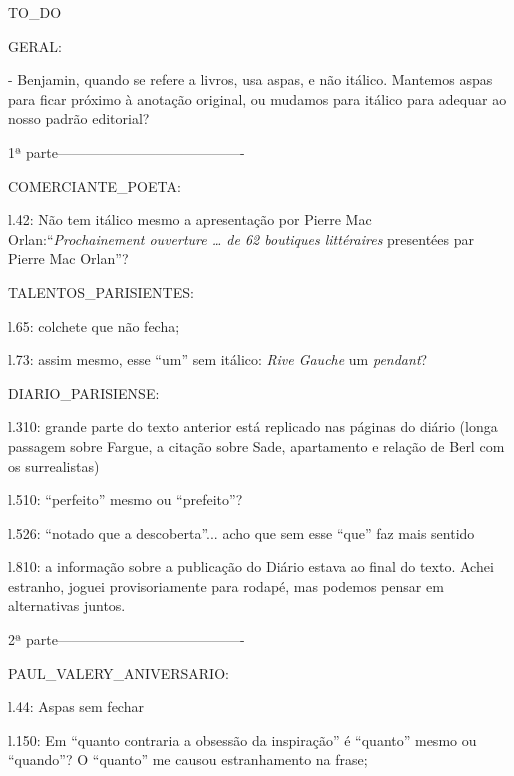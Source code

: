 TO_DO

GERAL:

- Benjamin, quando se refere a livros, usa aspas, e não itálico. Mantemos aspas para ficar próximo à anotação original, ou mudamos para itálico para adequar ao nosso padrão editorial?



1ª parte----------------------------------------

COMERCIANTE_POETA:

l.42: Não tem itálico mesmo a apresentação por Pierre Mac Orlan:``\emph{Prochainement ouverture \ldots{} de 62 boutiques littéraires} presentées par Pierre Mac Orlan''?

TALENTOS_PARISIENTES:

l.65: colchete que não fecha;

l.73: assim mesmo, esse ``um'' sem itálico: \emph{Rive Gauche} um \emph{pendant}?

DIARIO_PARISIENSE:

l.310: grande parte do texto anterior está replicado nas páginas do diário (longa passagem sobre Fargue, a citação sobre Sade, apartamento e relação de Berl com os surrealistas)

l.510: ``perfeito'' mesmo ou ``prefeito''?

l.526: ``notado que a descoberta''... acho que sem esse ``que'' faz mais sentido

l.810: a informação sobre a publicação do Diário estava ao final do texto. Achei estranho, joguei provisoriamente para rodapé, mas podemos pensar em alternativas juntos.


2ª parte----------------------------------------

PAUL_VALERY_ANIVERSARIO:

l.44: Aspas sem fechar

l.150: Em ``quanto contraria a obsessão da inspiração'' é ``quanto'' mesmo ou ``quando''? O ``quanto'' me causou estranhamento na frase;